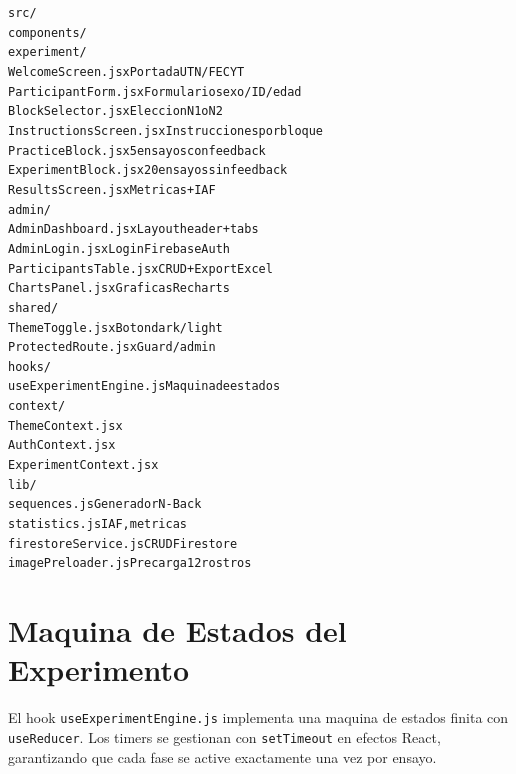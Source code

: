 \documentclass[12pt,a4paper]{article}
\begin{document}
\begin{tcolorbox}[codebox, title={Archivos principales del proyecto}]
\begin{alltt}
\small
src/
  components/
    experiment/
      WelcomeScreen.jsx      Portada UTN/FECYT
      ParticipantForm.jsx    Formulario sexo/ID/edad
      BlockSelector.jsx      Eleccion N1 o N2
      InstructionsScreen.jsx Instrucciones por bloque
      PracticeBlock.jsx      5 ensayos con feedback
      ExperimentBlock.jsx    20 ensayos sin feedback
      ResultsScreen.jsx      Metricas + IAF
    admin/
      AdminDashboard.jsx     Layout header + tabs
      AdminLogin.jsx         Login Firebase Auth
      ParticipantsTable.jsx  CRUD + Export Excel
      ChartsPanel.jsx        Graficas Recharts
    shared/
      ThemeToggle.jsx        Boton dark/light
      ProtectedRoute.jsx     Guard /admin
  hooks/
    useExperimentEngine.js   Maquina de estados
  context/
    ThemeContext.jsx
    AuthContext.jsx
    ExperimentContext.jsx
  lib/
    sequences.js             Generador N-Back
    statistics.js            IAF, metricas
    firestoreService.js      CRUD Firestore
    imagePreloader.js        Precarga 12 rostros
\end{alltt}
\end{tcolorbox}

\section{Maquina de Estados del Experimento}

El hook \texttt{useExperimentEngine.js} implementa una maquina de estados finita
con \texttt{useReducer}. Los timers se gestionan con \texttt{setTimeout} en efectos
React, garantizando que cada fase se active exactamente una vez por ensayo.

\begin{center}
\end{center}
\end{document}
